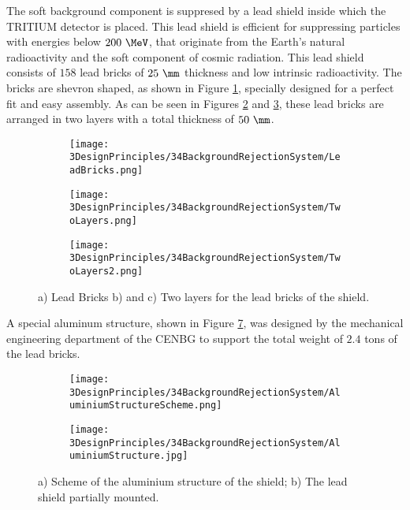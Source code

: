 The soft background component is suppresed by a lead shield inside which the TRITIUM detector is placed. This lead shield is efficient for suppressing particles with energies below $200~\MeV$, that originate from the Earth's natural radioactivity and the soft component of cosmic radiation. This lead shield consists of $158$ lead bricks of $25~\mm$ thickness and low intrinsic radioactivity. The bricks are shevron shaped, as shown in Figure \ref{subfig:LeadBricks}, specially designed for a perfect fit and easy assembly. As can be seen in Figures \ref{subfig:TwoLayers} and \ref{subfig:TwoLayers2}, these lead bricks are arranged in two layers with a total thickness of $50~\mm$. 

\begin{figure}[h]
\centering
    \begin{subfigure}[b]{0.3\textwidth}
    \centering
    \texttt{[image: 3DesignPrinciples/34BackgroundRejectionSystem/LeadBricks.png]}  
    \caption{\label{subfig:LeadBricks}}
    \end{subfigure}
    \hfill
    \begin{subfigure}[b]{0.3\textwidth}
    \centering
    \texttt{[image: 3DesignPrinciples/34BackgroundRejectionSystem/TwoLayers.png]}  
    \caption{\label{subfig:TwoLayers}}
    \end{subfigure}
    \hfill
    \begin{subfigure}[b]{0.3\textwidth}
    \centering
    \texttt{[image: 3DesignPrinciples/34BackgroundRejectionSystem/TwoLayers2.png]}  
    \caption{\label{subfig:TwoLayers2}}
    \end{subfigure}
 \caption{a) Lead Bricks b) and c) Two layers for the lead bricks of the shield.}
 \label{fig:LeadBricksAndArrangement}
\end{figure}

A special aluminum structure, shown in Figure \ref{fig:AluminiumStructure}, was designed by the mechanical engineering department of the CENBG to support the total weight of $2.4$ tons of the lead bricks.

\begin{figure}
\centering
    \begin{subfigure}[b]{0.45\textwidth}
    \centering
    \texttt{[image: 3DesignPrinciples/34BackgroundRejectionSystem/AluminiumStructureScheme.png]}  
    \caption{\label{subfig:AluminiumStructureScheme}}
    \end{subfigure}
    \hfill
    \begin{subfigure}[b]{0.4\textwidth}
    \centering
    \texttt{[image: 3DesignPrinciples/34BackgroundRejectionSystem/AluminiumStructure.jpg]}  
    \caption{\label{subfig:AluminiumStructure}}
    \end{subfigure}
    \caption{a) Scheme of the aluminium structure of the shield; b) The lead shield partially mounted.}
 \label{fig:AluminiumStructure}
\end{figure}

